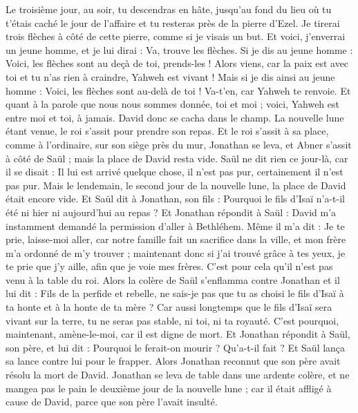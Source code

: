 \begin{multicols}{2}
Le troisième jour, au soir, tu descendras en hâte, jusqu'au fond du lieu où tu t'étais caché le jour de l'affaire et tu resteras près de la pierre d'Ezel.
Je tirerai trois flèches à côté de cette pierre, comme si je visais un but.
Et voici, j'enverrai un jeune homme, et je lui dirai : Va, trouve les flèches. Si je dis au jeune homme : Voici, les flèches sont au deçà de toi, prends-les ! Alors viens, car la paix est avec toi et tu n'as rien à craindre, Yahweh est vivant !
Mais si je dis ainsi au jeune homme : Voici, les flèches sont au-delà de toi ! Va-t'en, car Yahweh te renvoie.
Et quant à la parole que nous nous sommes donnée, toi et moi ; voici, Yahweh est entre moi et toi, à jamais.
David donc se cacha dans le champ. La nouvelle lune étant venue, le roi s'assit pour prendre son repas.
Et le roi s'assit à sa place, comme à l'ordinaire, sur son siège près du mur, Jonathan se leva, et Abner s'assit à côté de Saül ; mais la place de David resta vide.
Saül ne dit rien ce jour-là, car il se disait : Il lui est arrivé quelque chose, il n'est pas pur, certainement il n'est pas pur.
Mais le lendemain, le second jour de la nouvelle lune, la place de David était encore vide. Et Saül dit à Jonathan, son fils : Pourquoi le fils d'Isaï n'a-t-il été ni hier ni aujourd'hui au repas ?
Et Jonathan répondit à Saül : David m'a instamment demandé la permission d'aller à Bethléhem.
Même il m'a dit : Je te prie, laisse-moi aller, car notre famille fait un sacrifice dans la ville, et mon frère m'a ordonné de m'y trouver ; maintenant donc si j'ai trouvé grâce à tes yeux, je te prie que j'y aille, afin que je voie mes frères. C'est pour cela qu'il n'est pas venu à la table du roi.
Alors la colère de Saül s'enflamma contre Jonathan et il lui dit : Fils de la perfide et rebelle, ne sais-je pas que tu as choisi le fils d'Isaï à ta honte et à la honte de ta mère ?
Car aussi longtemps que le fils d'Isaï sera vivant sur la terre, tu ne seras pas stable, ni toi, ni ta royauté. C'est pourquoi, maintenant, amène-le-moi, car il est digne de mort.
Et Jonathan répondit à Saül, son père, et lui dit : Pourquoi le ferait-on mourir ? Qu'a-t-il fait ?
Et Saül lança sa lance contre lui pour le frapper. Alors Jonathan reconnut que son père avait résolu la mort de David.
Jonathan se leva de table dans une ardente colère, et ne mangea pas le pain le deuxième jour de la nouvelle lune ; car il était affligé à cause de David, parce que son père l'avait insulté.

\end{multicols}
